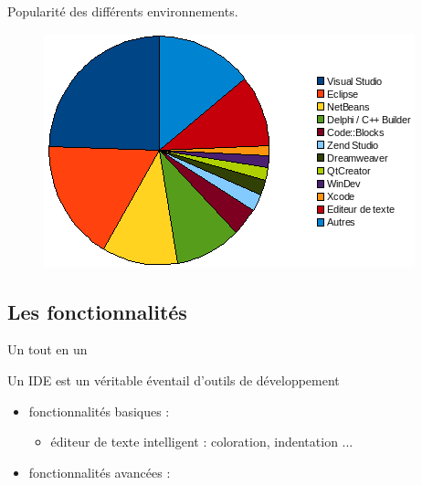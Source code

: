 \documentclass{beamer}
\begin{document}
\begin{frame}{Popularité des différents environnements.}

\begin{figure}
\includegraphics[scale=0.80]{../images/edi.png}			
\label{fromage}				
\end{figure}

\end{frame}



\subsection{Les fonctionnalités}



\begin{frame}{Un tout en un}

  Un IDE est un véritable éventail d'outils de développement 
  \begin{itemize}
  \item fonctionnalités basiques :
    \begin{itemize}
    \item
      éditeur de texte intelligent : coloration, indentation ...
      \pause
	\pause
\pause
\pause
\pause
    \end{itemize}
  \item
    fonctionnalités avancées :
    \begin{itemize}
\pause
\pause
\pause
    \end{itemize}
  \end{itemize}
\end{frame}
\end{document}
